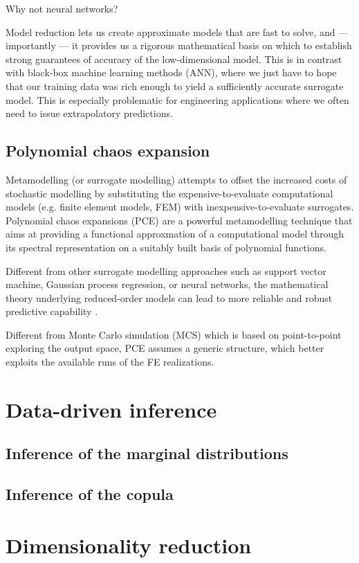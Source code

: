 Why not neural networks?

Model reduction lets us create approximate models that are fast to solve, and — importantly — it provides us a rigorous mathematical basis on which to establish strong guarantees of accuracy of the low-dimensional model. This is in contrast with black-box machine learning methods (ANN), where we just have to hope that our training data was rich enough to yield a sufficiently accurate surrogate model. This is especially problematic for engineering applications where we often need to issue extrapolatory predictions.

\subsection{Polynomial chaos expansion}
Metamodelling (or surrogate modelling) attempts to offset the increased costs of stochastic modelling by substituting the expensive-to-evaluate computational models (e.g. finite element models, FEM) with inexpensive-to-evaluate surrogates.
Polynomial chaos expansions (PCE) are a powerful metamodelling technique that aims at providing a functional approxmation of a computational model through its spectral representation on a suitably built basis of polynomial functions.

Different from other surrogate modelling approaches such as support vector machine, Gaussian process regression, or neural networks, the mathematical theory underlying reduced-order models can lead to more reliable and robust predictive capability \citep{frangos2010,kapteyn2021}.

Different from Monte Carlo simulation (MCS) which is based on point-to-point exploring the output space, PCE assumes a generic structure, which better exploits the available runs of the FE realizations.

\section{Data-driven inference}
\subsection{Inference of the marginal distributions}
\subsection{Inference of the copula}
\section{Dimensionality reduction}


